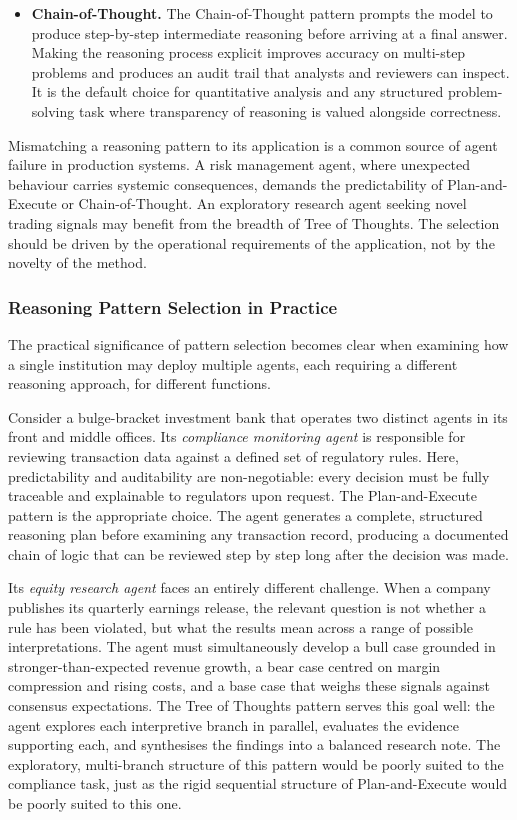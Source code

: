 \documentclass{article}
\begin{document}
\begin{itemize}
    \item{\textbf{Chain-of-Thought.}} The Chain-of-Thought pattern \cite{wei2022chain} prompts the model to produce step-by-step intermediate reasoning before arriving at a final answer. Making the reasoning process explicit improves accuracy on multi-step problems and produces an audit trail that analysts and reviewers can inspect. It is the default choice for quantitative analysis and any structured problem-solving task where transparency of reasoning is valued alongside correctness.
\end{itemize}

Mismatching a reasoning pattern to its application is a common source of agent
failure in production systems. A risk management agent, where unexpected
behaviour carries systemic consequences, demands the predictability of
Plan-and-Execute or Chain-of-Thought. An exploratory research agent seeking
novel trading signals may benefit from the breadth of Tree of Thoughts. The
selection should be driven by the operational requirements of the application,
not by the novelty of the method.

\subsubsection{Reasoning Pattern Selection in Practice}

The practical significance of pattern selection becomes clear when examining how a single institution may deploy multiple agents, each requiring a different reasoning approach, for different functions.

Consider a bulge-bracket investment bank that operates two distinct agents in its front and middle offices. Its \textit{compliance monitoring agent} is responsible for reviewing transaction data against a defined set of regulatory rules. Here, predictability and auditability are non-negotiable: every decision must be fully traceable and explainable to regulators upon request. The Plan-and-Execute pattern is the appropriate choice. The agent generates a complete, structured reasoning plan before examining any transaction record, producing a documented chain of logic that can be reviewed step by step long after the decision was made.

Its \textit{equity research agent} faces an entirely different challenge. When a company publishes its quarterly earnings release, the relevant question is not whether a rule has been violated, but what the results mean across a range of possible interpretations. The agent must simultaneously develop a bull case grounded in stronger-than-expected revenue growth, a bear case centred on margin compression and rising costs, and a base case that weighs these signals against consensus expectations. The Tree of Thoughts pattern serves this goal well: the agent explores each interpretive branch in parallel, evaluates the evidence supporting each, and synthesises the findings into a balanced research note. The exploratory, multi-branch structure of this pattern would be poorly suited to the compliance task, just as the rigid sequential structure of Plan-and-Execute would be poorly suited to this one.
\end{document}
